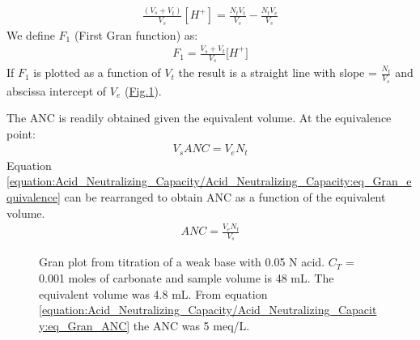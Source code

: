 \documentclass[letterpaper,10pt,english]{sphinxmanual}
\let\sphinxpxdimen\pdfpxdimen\else\newdimen\sphinxpxdimen
\begin{document}
\begin{equation}\label{equation:Acid_Neutralizing_Capacity/Acid_Neutralizing_Capacity:Acid_Neutralizing_Capacity/Acid_Neutralizing_Capacity:1}
\begin{split}\frac{\left(V_{s} +V_{t} \right)}{V_{s} } \left[H^{+} \right]=\frac{N_{t} V_{t} }{V_{s} } -\frac{N_{t} V_{e} }{V_{s} }\end{split}
\end{equation}
We define \(F_1\) (First Gran function) as:
\begin{equation}\label{equation:Acid_Neutralizing_Capacity/Acid_Neutralizing_Capacity:eq_Gran_F1}
\begin{split} F_1 = \frac{V_s +V_t }{V_s } {[H}^+ {]}\end{split}
\end{equation}
If \(F_1\) is plotted as a function of \(V_t\) the result is a straight line with slope = \(\frac{N_{t} }{V_{s} }\) and abscissa intercept of \(V_e\) (\hyperref[\detokenize{Acid_Neutralizing_Capacity/Acid_Neutralizing_Capacity:figure-gran-plot}]{Fig.\@ \ref{\detokenize{Acid_Neutralizing_Capacity/Acid_Neutralizing_Capacity:figure-gran-plot}}}).

The ANC is readily obtained given the equivalent volume. At the equivalence point:
\begin{equation}\label{equation:Acid_Neutralizing_Capacity/Acid_Neutralizing_Capacity:eq_Gran_equivalence}
\begin{split} V_s ANC= V_e N_t\end{split}
\end{equation}
Equation \eqref{equation:Acid_Neutralizing_Capacity/Acid_Neutralizing_Capacity:eq_Gran_equivalence} can be rearranged to obtain ANC as a function of the equivalent volume.
\begin{equation}\label{equation:Acid_Neutralizing_Capacity/Acid_Neutralizing_Capacity:eq_Gran_ANC}
\begin{split} ANC=\frac{V_e N_t }{V_s }\end{split}
\end{equation}
\begin{figure}[htbp]
\centering
\capstart

\noindent\sphinxincludegraphics[width=300\sphinxpxdimen]{{Gran_plot}.png}
\caption{Gran plot from titration of a weak base with 0.05 N acid. \(C_T\) = 0.001 moles of carbonate and sample volume is 48 mL. The equivalent volume was 4.8 mL. From equation  \eqref{equation:Acid_Neutralizing_Capacity/Acid_Neutralizing_Capacity:eq_Gran_ANC} the ANC was 5 meq/L.}\label{\detokenize{Acid_Neutralizing_Capacity/Acid_Neutralizing_Capacity:id1}}\label{\detokenize{Acid_Neutralizing_Capacity/Acid_Neutralizing_Capacity:figure-gran-plot}}\end{figure}
\end{document}
